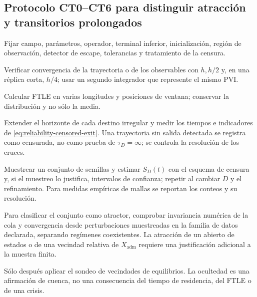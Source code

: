 \subsection{Protocolo CT0--CT6 para distinguir atracción y transitorios prolongados}
\label{subsec:protocolo-transitorios}

\begin{description}[style=nextline,leftmargin=3.4em,labelwidth=2.9em]
 \item[CT0] Fijar campo, parámetros, operador, terminal inferior,
  inicialización, región de observación, detector de escape, tolerancias y
  tratamiento de la censura.
 \item[CT1] Verificar convergencia de la trayectoria o de los observables con
 \(h,h/2\) y, en una réplica corta, \(h/4\); usar un segundo integrador que
 represente el mismo PVI.
 \item[CT2] Calcular FTLE en varias longitudes y posiciones de ventana;
 conservar la distribución y no sólo la media.
 \item[CT3] Extender el horizonte de cada destino irregular y medir
  los tiempos e indicadores de \cref{eq:reliability-censored-exit}. Una
  trayectoria sin salida detectada se registra como censurada, no como prueba
  de \(\tau_D=\infty\); se controla la resolución de los cruces.
 \item[CT4] Muestrear un conjunto de semillas y estimar \(S_D(t)\) con
  el esquema de censura y, si el muestreo lo justifica, intervalos de confianza;
  repetir al cambiar \(D\) y el refinamiento. Para medidas empíricas de mallas
  se reportan los conteos y su resolución.
 \item[CT5] Para clasificar el conjunto como atractor, comprobar invariancia
 numérica de la cola
  y convergencia desde perturbaciones muestreadas en la familia de datos
  declarada, separando regímenes coexistentes. La atracción de un abierto de
  estados o de una vecindad relativa de \(X_{\mathrm{adm}}\) requiere una
  justificación adicional a la muestra finita.
 \item[CT6] Sólo después aplicar el sondeo de vecindades de equilibrios. La
 ocultedad es una afirmación de cuenca, no una consecuencia del tiempo de
 residencia, del FTLE o de una crisis.
\end{description}


